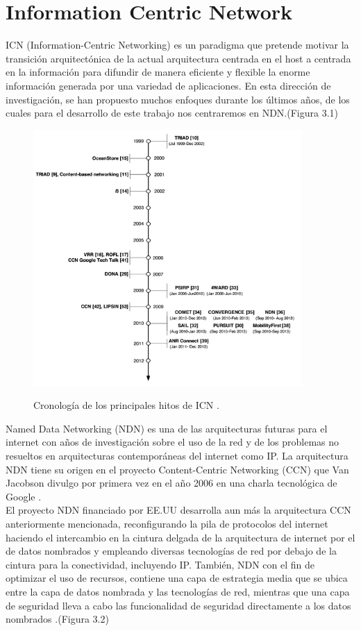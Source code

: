 \documentclass[12pt]{ociamthesis}  %
\begin{document}
\section{Information Centric Network}
ICN (Information-Centric Networking) es un paradigma que pretende motivar la transición arquitectónica de la actual arquitectura centrada en el host a centrada en la información para difundir de manera eficiente y flexible la enorme información generada por una variedad de aplicaciones. En esta dirección de investigación, se han propuesto muchos enfoques durante los últimos años, de los cuales para el desarrollo de este trabajo nos centraremos en NDN.(Figura 3.1)
	\begin{figure}[!htb]
		\centering
		\includegraphics[width=10.2cm]{Linea_Temporal_ICN.png}\\
		\caption{Cronología de los principales hitos de ICN \cite{xylomenos2014survey}.}
		\label{fig:mesh1}
	\end{figure}

Named Data Networking (NDN) es una de las arquitecturas futuras para el internet con años de investigación sobre el uso de la red y de los problemas no resueltos en arquitecturas contemporáneas del internet como IP\cite{nsf10528}\cite{nsf13538}. La arquitectura NDN tiene su origen en el proyecto Content-Centric Networking (CCN) que Van Jacobson divulgo por primera vez en el año 2006 en una charla tecnológica de Google \cite{jacobson2006new}.\\

El proyecto NDN financiado por EE.UU desarrolla aun más la arquitectura CCN anteriormente mencionada, reconfigurando la pila de protocolos del internet haciendo el intercambio en la cintura delgada de la arquitectura de internet por el de datos nombrados y empleando diversas tecnologías de red por debajo de la cintura para la conectividad, incluyendo IP. También, NDN con el fin de optimizar el uso de recursos, contiene una capa de estrategia media que se ubica entre la capa de datos nombrada y las tecnologías de red, mientras que una capa de seguridad lleva a cabo las funcionalidad de seguridad directamente a los datos nombrados \cite{xylomenos2014survey} .(Figura 3.2)\\
\end{document}
